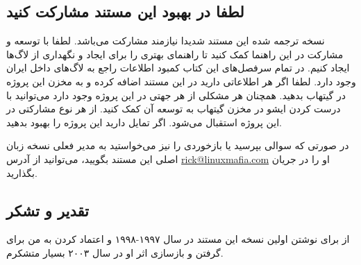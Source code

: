 \subsection{لطفا در  بهبود این مستند مشارکت کنید}

نسخه ترجمه شده این مستند شدیدا نیازمند مشارکت می‌باشد. لطفا با توسعه و مشارکت در این راهنما
کمک کنید تا راهنمای بهتری را برای ایجاد و نگهداری از لاگ‌ها ایجاد کنیم. در تمام سرفصل‌های این کتاب
کمبود اطلاعات راجع به لاگ‌های داخل ایران وجود دارد. لطفا اگر هر اطلاعاتی دارید در این مستند اضافه کرده
و به مخزن این پروژه در گیتهاب  بدهید. همچنان هر مشکلی از هر جهتی در این پروژه وجود دارد
می‌توانید با درست کردن ایشو در مخزن گیتهاب
به توسعه آن کمک کنید.
از هر نوع مشارکتی در این پروژه استقبال می‌شود. اگر تمایل دارید این پروژه را بهبود بدهید.

در صورتی که سوالی بپرسید یا بازخوردی را نیز می‌خواستید به مدیر فعلی نسخه زبان اصلی این مستند بگویید،
می‌توانید از آدرس
\href{mailto:rick@linuxmafia.com}{rick@linuxmafia.com}
او را در جریان بگذارید.


%

\subsection{تقدیر و تشکر}

از
برای نوشتن اولین نسخه این مستند در سال ۱۹۹۷-۱۹۹۸ و اعتماد کردن به من برای گرفتن و بازسازی
اثر او در سال ۲۰۰۳ بسیار متشکرم.

